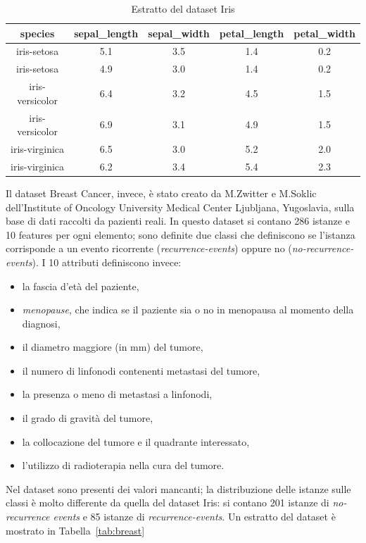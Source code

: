 \documentclass[oneside, openany]{book}
\begin{document}
	\begin{table}
		\caption{Estratto del dataset Iris}
		\begin{center}
			\begin{tabular}{|c|c|c|c|c|}
					\hline
					species &  sepal\_length &  sepal\_width &  petal\_length &  petal\_width \\
					\hline
					iris-setosa &           5.1 &          3.5 &           1.4 &          0.2 \\
					iris-setosa &           4.9 &          3.0 &           1.4 &          0.2 \\
					iris-versicolor &           6.4 &		3.2 &			4.5 &			1.5 \\
					iris-versicolor &           6.9 &          3.1 &        4.9 &          1.5 \\
					iris-virginica &           6.5 &          3.0 &           5.2 &          2.0 \\
					iris-virginica &           6.2 &          3.4 &           5.4 &          2.3 \\
					\hline
			\end{tabular}
		\end{center}
		\label{tab:iris}
	\end{table}

	Il dataset Breast Cancer, invece, è stato creato da M.Zwitter e M.Soklic dell'Institute of Oncology University Medical Center Ljubljana, Yugoslavia, sulla base di dati raccolti da pazienti reali. In questo dataset si contano 286 istanze e 10 features per ogni elemento; sono definite due classi che definiscono se l'istanza corrisponde a un evento ricorrente (\textit{recurrence-events}) oppure no (\textit{no-recurrence-events}). I 10 attributi definiscono invece:
	\begin{itemize}
		\item{la fascia d'età del paziente,}
		\item{\textit{menopause}, che indica se il paziente sia o no in menopausa al momento della diagnosi,}
		\item{il diametro maggiore (in mm) del tumore,}
		\item{il numero di linfonodi contenenti metastasi del tumore,}
		\item{la presenza o meno di metastasi a linfonodi,}
		\item{il grado di gravità del tumore,}
		\item{la collocazione del tumore e il quadrante interessato,}
		\item{l'utilizzo di radioterapia nella cura del tumore.}
	\end{itemize}	
	Nel dataset sono presenti dei valori mancanti; la distribuzione delle istanze sulle classi è molto differente da quella del dataset Iris: si contano 201 istanze di \textit{no-recurrence events} e 85 istanze di \textit{recurrence-events}. Un estratto del dataset è mostrato in Tabella~\ref{tab:breast}
	
\end{document}
